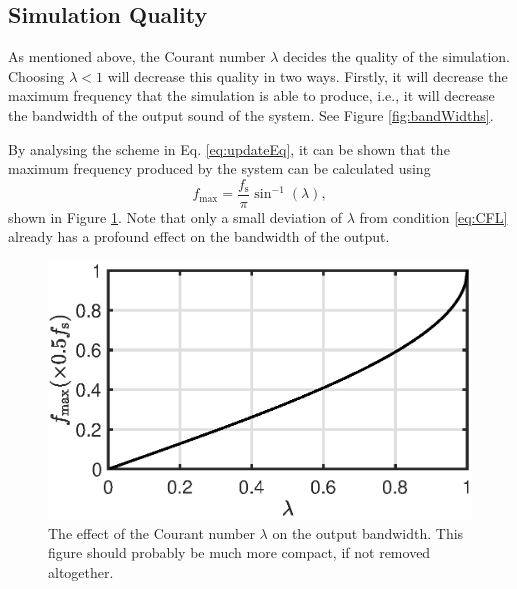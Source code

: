 \documentclass[dvipsnames, reprint]{JASA}
\def\SWcomment[#1]{\textcolor{Bittersweet}{#1}}
\begin{document}
\subsection{Simulation Quality}\label{sec:quality}
As mentioned above, the Courant number $\lambda$ decides the quality of the simulation. Choosing $\lambda < 1$ will decrease this quality in two ways. Firstly, it will decrease the maximum frequency that the simulation is able to produce, i.e., it will decrease the bandwidth of the output sound of the system. See Figure \ref{fig:bandWidths}.
%
\begin{figure}
\end{figure}
%
By analysing the scheme in Eq. \eqref{eq:updateEq}, it can be shown that the maximum frequency produced by the system can be calculated using \cite[Chap. 6]{bilbao2009}
\begin{equation}\label{eq:fmax}
    f_\text{max} = \frac{f_\text{s}}{\pi} \sin^{-1}(\lambda),
\end{equation}
shown in Figure \ref{fig:bandWidthFormula}.
%
Note that only a small deviation of $\lambda$ from condition \eqref{eq:CFL} already has a profound effect on the bandwidth of the output.

\begin{figure}
\includegraphics[width=\reprintcolumnwidth]{bandwidthPlot}
\caption{\label{fig:bandWidthFormula}{The effect of the Courant number $\lambda$ on the output bandwidth. \SWcomment[This figure should probably be much more compact, if not removed altogether.]}}
\end{figure} 
\end{document}
